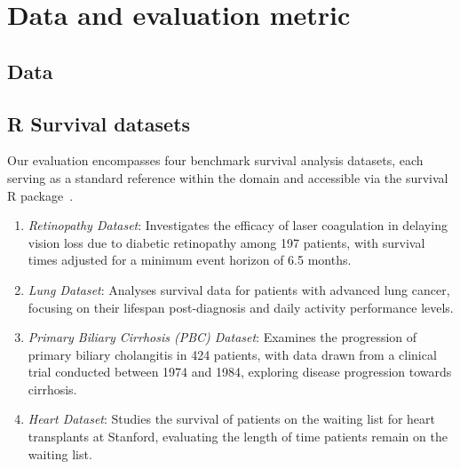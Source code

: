 \documentclass[3p,review,authoryear]{elsarticle}
\begin{document}
\section{Data and evaluation metric}


\subsection{Data}

\subsection{R Survival datasets}

Our evaluation encompasses four benchmark survival analysis datasets, each serving as a standard reference within the domain and accessible via the survival R package~\citep{survival-package}.

\begin{enumerate}
\item \textit{Retinopathy Dataset}: Investigates the efficacy of laser coagulation in delaying vision loss due to diabetic retinopathy among 197 patients, with survival times adjusted for a minimum event horizon of 6.5 months.
\item \textit{Lung Dataset}: Analyses survival data for patients with advanced lung cancer, focusing on their lifespan post-diagnosis and daily activity performance levels.
\item \textit{Primary Biliary Cirrhosis (PBC) Dataset}: Examines the progression of primary biliary cholangitis in 424 patients, with data drawn from a clinical trial conducted between 1974 and 1984, exploring disease progression towards cirrhosis.
\item \textit{Heart Dataset}: Studies the survival of patients on the waiting list for heart transplants at Stanford, evaluating the length of time patients remain on the waiting list.
\end{enumerate}

\begin{table}[h!]
\centering
\caption{Main properties of the datasets. Censoring shows the percentage of censored observations.}
\label{table:dataset}
\end{table}%
\end{document}
